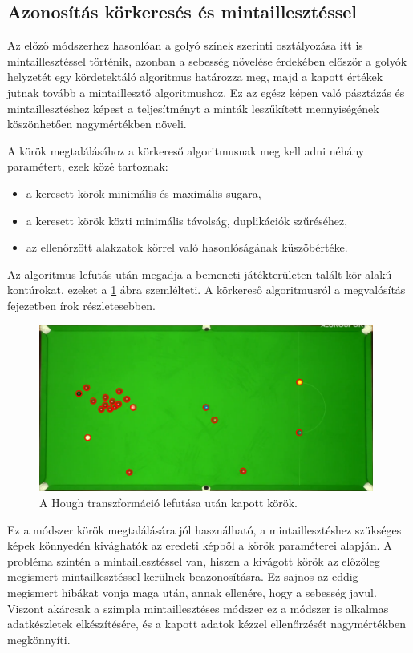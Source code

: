 \subsection{Azonosítás körkeresés és mintaillesztéssel}
Az előző módszerhez hasonlóan a golyó színek szerinti osztályozása itt is mintaillesztéssel történik, azonban a sebesség növelése érdekében először a golyók helyzetét egy kördetektáló algoritmus határozza meg, majd a kapott értékek jutnak tovább a mintaillesztő algoritmushoz. Ez az egész képen való pásztázás és mintaillesztéshez képest a teljesítményt a minták leszűkített mennyiségének köszönhetően nagymértékben növeli.

\par A körök megtalálásához a körkereső algoritmusnak meg kell adni néhány paramétert, ezek közé tartoznak:
\begin{itemize}
    \setlength\itemsep{-2pt}
    \item a keresett körök minimális és maximális sugara,
    \item a keresett körök közti minimális távolság, duplikációk szűréséhez,
    \item az ellenőrzött alakzatok körrel való hasonlóságának küszöbértéke.
\end{itemize}
\par Az algoritmus lefutás után megadja a bemeneti játékterületen talált kör alakú kontúrokat, ezeket a \ref{fig:talalt_korok} ábra szemlélteti. A körkereső algoritmusról a megvalósítás fejezetben írok részletesebben.

\begin{figure}[!ht]
    \centering
    \includegraphics[width=110mm, keepaspectratio]{figures/detected_circles.png}
    \caption{A Hough transzformáció lefutása után kapott körök.}
    \label{fig:talalt_korok}
\end{figure}

\par Ez a módszer körök megtalálására jól használható, a mintaillesztéshez szükséges képek könnyedén kivághatók az eredeti képből a körök paraméterei alapján. A probléma szintén a mintaillesztéssel van, hiszen a kivágott körök az előzőleg megismert mintaillesztéssel kerülnek beazonosításra. Ez sajnos az eddig megismert hibákat vonja maga után, annak ellenére, hogy a sebesség javul. Viszont akárcsak a szimpla mintaillesztéses módszer ez a módszer is alkalmas adatkészletek elkészítésére, és a kapott adatok kézzel ellenőrzését nagymértékben megkönnyíti.

